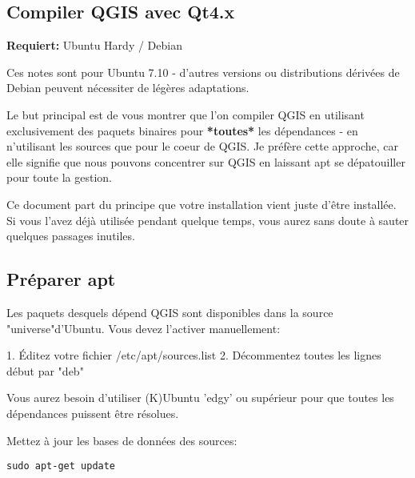 \subsection{Compiler QGIS avec Qt4.x}
\textbf{Requiert:} Ubuntu Hardy / Debian

Ces notes sont pour Ubuntu 7.10 - d'autres versions ou distributions dérivées de Debian peuvent nécessiter de légères adaptations.

Le but principal est de vous montrer que l'on compiler QGIS en utilisant exclusivement des paquets binaires pour \textbf{*toutes*} les dépendances - en n'utilisant les sources que pour le coeur de QGIS. Je préfère cette approche, car elle signifie que nous pouvons concentrer sur QGIS en laissant apt se dépatouiller pour toute la gestion.

Ce document part du principe que votre installation vient juste d'être installée. Si vous l'avez déjà utilisée pendant quelque temps, vous aurez sans doute à sauter quelques passages inutiles.

% 
% 
% 
% 

\subsection{Préparer apt}
Les paquets desquels dépend QGIS sont disponibles dans la source "universe"d'Ubuntu. Vous devez l'activer manuellement:

1. Éditez votre fichier /etc/apt/sources.list   
2. Décommentez toutes les lignes début par "deb"

Vous aurez besoin d'utiliser (K)Ubuntu 'edgy' ou supérieur pour que toutes les dépendances puissent être résolues.

Mettez à jour les bases de données des sources:

\begin{verbatim}
sudo apt-get update 
\end{verbatim}

